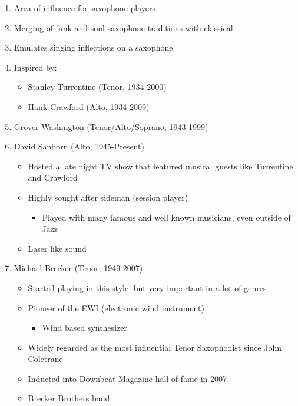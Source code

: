 \documentclass[]{article}
\providecommand{\tightlist}{%
  \setlength{\itemsep}{0pt}\setlength{\parskip}{0pt}}
\begin{document}
\begin{enumerate}
\def\labelenumi{\arabic{enumi}.}
\tightlist
\item
  Area of influence for saxophone players
\item
  Merging of funk and soul saxophone traditions with classical
\item
  Emulates singing inflections on a saxophone
\item
  Inspired by:

  \begin{itemize}
  \tightlist
  \item
    Stanley Turrentine (Tenor, 1934-2000)
  \item
    Hank Crawford (Alto, 1934-2009)
  \end{itemize}
\item
  Grover Washington (Tenor/Alto/Soprano, 1943-1999)
\item
  David Sanborn (Alto, 1945-Present)

  \begin{itemize}
  \tightlist
  \item
    Hosted a late night TV show that featured musical guests like
    Turrentine and Crawford
  \item
    Highly sought after sideman (session player)

    \begin{itemize}
    \tightlist
    \item
      Played with many famous and well known musicians, even outside of
      Jazz
    \end{itemize}
  \item
    Laser like sound
  \end{itemize}
\item
  Michael Brecker (Tenor, 1949-2007)

  \begin{itemize}
  \tightlist
  \item
    Started playing in this style, but very important in a lot of genres
  \item
    Pioneer of the EWI (electronic wind instrument)

    \begin{itemize}
    \tightlist
    \item
      Wind based synthesizer
    \end{itemize}
  \item
    Widely regarded as the most influential Tenor Saxophonist since John
    Coletrane
  \item
    Inducted into Downbeat Magazine hall of fame in 2007
  \item
    Brecker Brothers band
  \end{itemize}
\end{enumerate}
\end{document}
